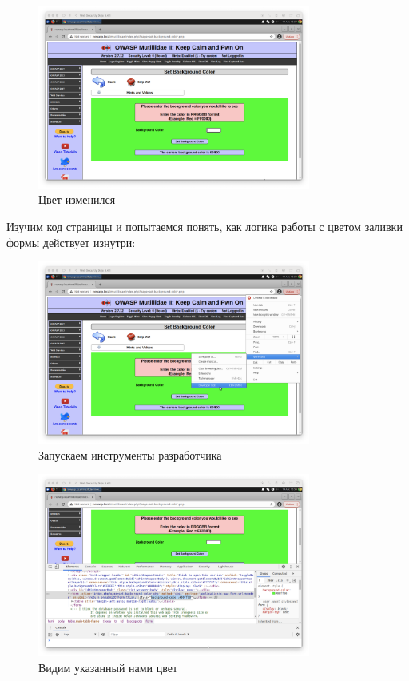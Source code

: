 \documentclass[a4paper]{article}
\begin{document}
  \begin{figure}[H]
    \centering
    \includegraphics[width=0.8\textwidth]{step_00005}
    \caption{Цвет изменился}
  \end{figure}

  Изучим код страницы и попытаемся понять, как логика работы с цветом заливки формы
  действует изнутри:

  \begin{figure}[H]
    \centering
    \includegraphics[width=0.8\textwidth]{step_00006}
    \caption{Запускаем инструменты разработчика}
  \end{figure}

  \begin{figure}[H]
    \centering
    \includegraphics[width=0.8\textwidth]{step_00007}
    \caption{Видим указанный нами цвет}
  \end{figure}
\end{document}
